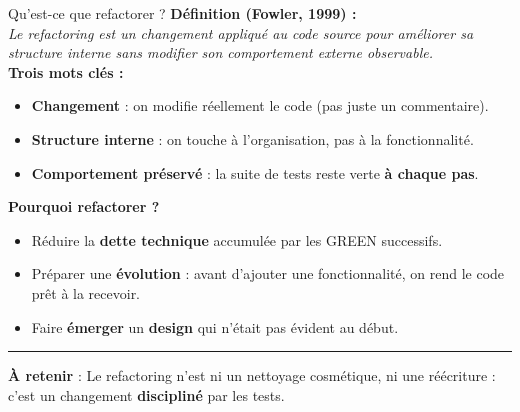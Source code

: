 \documentclass[aspectratio=169,11pt]{beamer}
\newcommand{\takeaway}[1]{%
\vfill\begin{beamercolorbox}[wd=\linewidth,sep=0.4em]{}
\color{accent2}\rule[0.6ex]{1.2em}{1.2pt}\hspace{0.4em}%
\textbf{\color{accent2}\small À retenir} \textcolor{textsoft}{:} %
{\small\color{textmain}#1}
\end{beamercolorbox}}
\begin{document}
\begin{frame}[t]{Qu'est-ce que refactorer ?}
\footnotesize
\textbf{Définition (Fowler, 1999) :} \\[0.3em]
\textit{Le refactoring est un changement appliqué au code source pour améliorer sa structure interne sans modifier son comportement externe observable.}\\[0.5em]

\textbf{Trois mots clés :}
\begin{itemize}\itemsep0.1em
\item \textbf{Changement} : on modifie réellement le code (pas juste un commentaire).
\item \textbf{Structure interne} : on touche à l'organisation, pas à la fonctionnalité.
\item \textbf{Comportement préservé} : la suite de tests reste verte \textbf{à chaque pas}.
\end{itemize}
\vspace{0.4cm}
\textbf{Pourquoi refactorer ?}
\begin{itemize}\itemsep0.05em
\item Réduire la \textbf{dette technique} accumulée par les \og GREEN \fg{} successifs.
\item Préparer une \textbf{évolution} : avant d'ajouter une fonctionnalité, on rend le code prêt à la recevoir.
\item Faire \textbf{émerger} un \textbf{design} qui n'était pas évident au début.
\end{itemize}
\takeaway{Le refactoring n'est ni un nettoyage cosmétique, ni une réécriture : c'est un changement \textbf{discipliné} par les tests.}
\end{frame}
\end{document}
